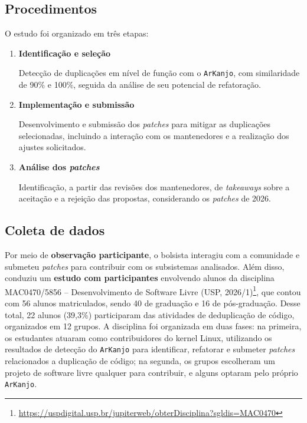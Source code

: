 \documentclass[oneside]{abntlatex}
\begin{document}
\subsection{Procedimentos}

O estudo foi organizado em três etapas:

\begin{enumerate}
    \item \textbf{Identificação e seleção}

    Detecção de duplicações em nível de função com o \texttt{ArKanjo}, com similaridade de 90\% e 100\%, seguida da análise de seu potencial de refatoração.

    \item \textbf{Implementação e submissão}

    Desenvolvimento e submissão dos \textit{patches} para mitigar as duplicações selecionadas, incluindo a interação com os mantenedores e a realização dos ajustes solicitados.

    \item \textbf{Análise dos \textit{patches}}

    Identificação, a partir das revisões dos mantenedores, de \textit{takeaways} sobre a aceitação e a rejeição das propostas, considerando os \textit{patches} de 2026.
\end{enumerate}

\subsection{Coleta de dados}\label{sec:coleta-dados}


Por meio de \textbf{observação participante}, o bolsista interagiu com a comunidade e submeteu \textit{patches} para contribuir com os subsistemas analisados. Além disso, conduziu um \textbf{estudo com participantes} envolvendo alunos da disciplina MAC0470/5856 -- Desenvolvimento de Software Livre (USP, 2026/1)\footnote{\url{https://uspdigital.usp.br/jupiterweb/obterDisciplina?sgldis=MAC0470}}, que contou com 56 alunos matriculados, sendo 40 de graduação e 16 de pós-graduação. Desse total, 22 alunos (39,3\%) participaram das atividades de deduplicação de código, organizados em 12 grupos. A disciplina foi organizada em duas fases: na primeira, os estudantes atuaram como contribuidores do kernel Linux, utilizando os resultados de detecção do \texttt{ArKanjo} para identificar, refatorar e submeter \textit{patches} relacionados a duplicação de código; na segunda, os grupos escolheram um projeto de software livre qualquer para contribuir, e alguns optaram pelo próprio \texttt{ArKanjo}.
\end{document}
